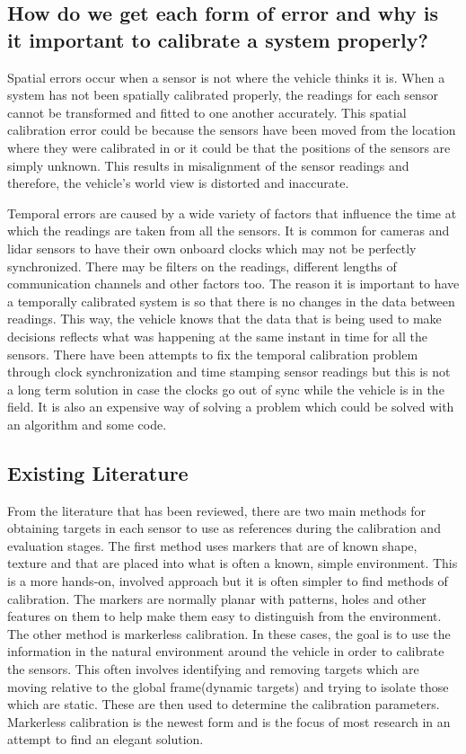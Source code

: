 
\subsection{How do we get each form of error and why is it important to calibrate a system properly?}
Spatial errors occur when a sensor is not where the vehicle thinks it is. When a system has not been spatially calibrated properly, the readings for each sensor cannot be transformed and fitted to one another accurately. This spatial calibration error could be because the sensors have been moved from the location where they were calibrated in or it could be that the positions of the sensors are simply unknown. This results in misalignment of the sensor readings and therefore, the vehicle's world view is distorted and inaccurate.

Temporal errors are caused by a wide variety of factors that influence the time at which the readings are taken from all the sensors. It is common for cameras and lidar sensors to have their own onboard clocks which may not be perfectly synchronized. There may be filters on the readings, different lengths of communication channels and other factors too. The reason it is important to have a temporally calibrated system is so that there is no changes in the data between readings. This way, the vehicle knows that the data that is being used to make decisions reflects what was happening at the same instant in time for all the sensors. 
There have been attempts to fix the temporal calibration problem through clock synchronization and time stamping sensor readings but this is not a long term solution in case the clocks go out of sync while the vehicle is in the field. It is also an expensive way of solving a problem which could be solved with an algorithm and some code. 

\subsection{Existing Literature}
From the literature that has been reviewed, there are two main methods for obtaining targets in each sensor to use as references during the calibration and evaluation stages. The first method uses markers that are of known shape, texture and that are placed into what is often a known, simple environment. This is a more hands-on, involved approach but it is often simpler to find methods of calibration. The markers are normally planar with patterns, holes and other features on them to help make them easy to distinguish from the environment.
The other method is markerless calibration. In these cases, the goal is to use the information in the natural environment around the vehicle in order to calibrate the sensors. This often involves identifying and removing targets which are moving relative to the global frame(dynamic targets) and trying to isolate those which are static. These are then used to determine the calibration parameters.\\
Markerless calibration is the newest form and is the focus of most research in an attempt to find an elegant solution. 
 

